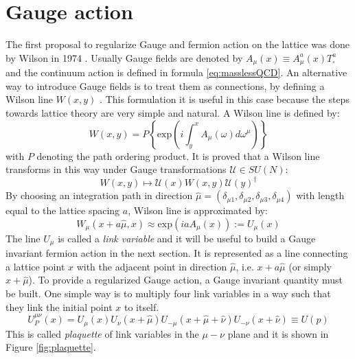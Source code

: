 \documentclass[english, LaM, oneside, noexaminfo]{sapthesis}
\begin{document}
\section{Gauge action}
\noindent
The first proposal to regularize Gauge and fermion action on the lattice was done by Wilson in 1974 \cite{Wilson-Confinement-of-Quarks}.
Usually Gauge fields are denoted by $A_\mu (x) \equiv A_\mu^a(x)T^a_{\square}$ and the continuum action is defined in formula \ref{eq:masslessQCD}.
An alternative way to introduce Gauge fields is to treat them as connections, by defining a Wilson line $W(x,y)$ \cite{Schwartz}.
This formulation it is useful in this case because the steps towards lattice theory are very simple and natural.
A Wilson line is defined by:
\begin{equation*}
    W(x,y) = P \left\{\text{exp}\left(i\int_y^x A_\mu(\omega)d\omega^\mu\right)\right\}
\end{equation*}
with $P$ denoting the path ordering product.
It is proved that a Wilson line transforms in this way under Gauge transformations $\mathcal{U}\in SU(N)$:
\begin{equation}\label{eq:wline-transformation}
    W(x,y) \longmapsto \mathcal{U}(x) W(x,y) \mathcal{U}(y)^\dagger
\end{equation}
By choosing an integration path in direction $\hat\mu = (\delta_{\mu 1},\delta_{\mu 2},\delta_{\mu 3},\delta_{\mu 4})$ with length equal to the lattice spacing $a$, Wilson line is approximated by:
\begin{equation*}
    W_\mu(x+a\hat\mu, x) \approx \text{exp}\left(iaA_\mu (x)\right) := U_\mu (x)
\end{equation*}
The line $U_\mu$ is called a {\it link variable} and it will be useful to build a Gauge invariant fermion action in the next section.
It is represented as a line connecting a lattice point $x$ with the adjacent point in direction $\hat\mu$, i.e. $x+a\hat\mu$ (or simply $x+\hat\mu$).
\newline
To provide a regularized Gauge action, a Gauge invariant quantity must be built.
One simple way is to multiply four link variables in a way such that they link the initial point $x$ to itself.
\begin{equation*}
    U_P^{\mu\nu}(x) = U_\mu (x) U_\nu (x+\hat\mu) U_{-\mu} (x+\hat\mu+\hat\nu) U_{-\nu} (x+\hat\nu)  \equiv U(p)
\end{equation*}
This is called {\it plaquette} of link variables in the $\mu-\nu$ plane and it is shown in Figure \ref{fig:plaquette}.
\end{document}
